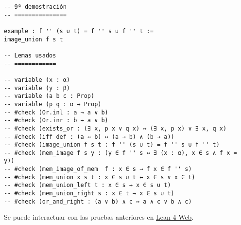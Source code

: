 \begin{verbatim}
-- 9ª demostración
-- ===============

example : f '' (s ∪ t) = f '' s ∪ f '' t :=
image_union f s t

-- Lemas usados
-- ============

-- variable (x : α)
-- variable (y : β)
-- variable (a b c : Prop)
-- variable (p q : α → Prop)
-- #check (Or.inl : a → a ∨ b)
-- #check (Or.inr : b → a ∨ b)
-- #check (exists_or : (∃ x, p x ∨ q x) ↔ (∃ x, p x) ∨ ∃ x, q x)
-- #check (iff_def : (a ↔ b) ↔ (a → b) ∧ (b → a))
-- #check (image_union f s t : f '' (s ∪ t) = f '' s ∪ f '' t)
-- #check (mem_image f s y : (y ∈ f '' s ↔ ∃ (x : α), x ∈ s ∧ f x = y))
-- #check (mem_image_of_mem  f : x ∈ s → f x ∈ f '' s)
-- #check (mem_union x s t : x ∈ s ∪ t ↔ x ∈ s ∨ x ∈ t)
-- #check (mem_union_left t : x ∈ s → x ∈ s ∪ t)
-- #check (mem_union_right s : x ∈ t → x ∈ s ∪ t)
-- #check (or_and_right : (a ∨ b) ∧ c ↔ a ∧ c ∨ b ∧ c)
\end{verbatim}
Se puede interactuar con las pruebas anteriores en \href{https://lean.math.hhu.de/\#url=https://raw.githubusercontent.com/jaalonso/Calculemus2/main/src/Imagen\_de\_la\_union.lean}{Lean 4 Web}.

